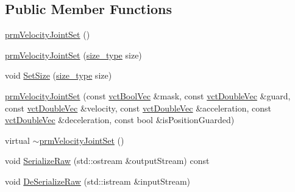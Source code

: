 \subsection*{Public Member Functions}
\begin{DoxyCompactItemize}
\item 
\hyperlink{classprm_velocity_joint_set_a6c2c220f64bc8fafb07241815f2546de}{prm\-Velocity\-Joint\-Set} ()
\item 
\hyperlink{classprm_velocity_joint_set_a17bb88da2e0fe253726edd28b64235bb}{prm\-Velocity\-Joint\-Set} (\hyperlink{classprm_velocity_joint_set_a48434c7a4127357203c7cff1e6f2a429}{size\-\_\-type} size)
\item 
void \hyperlink{classprm_velocity_joint_set_a307b54b4c94077003b5aa83531b6bc07}{Set\-Size} (\hyperlink{classprm_velocity_joint_set_a48434c7a4127357203c7cff1e6f2a429}{size\-\_\-type} size)
\item 
\hyperlink{classprm_velocity_joint_set_a756a5405815b878cf325ed779582100e}{prm\-Velocity\-Joint\-Set} (const \hyperlink{vct_dynamic_vector_types_8h_aeb2237c134aee3769198bd9d55c8a9e0}{vct\-Bool\-Vec} \&mask, const \hyperlink{vct_dynamic_vector_types_8h_ade4b3068c86fb88f41af2e5187e491c2}{vct\-Double\-Vec} \&guard, const \hyperlink{vct_dynamic_vector_types_8h_ade4b3068c86fb88f41af2e5187e491c2}{vct\-Double\-Vec} \&velocity, const \hyperlink{vct_dynamic_vector_types_8h_ade4b3068c86fb88f41af2e5187e491c2}{vct\-Double\-Vec} \&acceleration, const \hyperlink{vct_dynamic_vector_types_8h_ade4b3068c86fb88f41af2e5187e491c2}{vct\-Double\-Vec} \&deceleration, const bool \&is\-Position\-Guarded)
\item 
virtual \hyperlink{classprm_velocity_joint_set_a462dcbe624a12501c8e9d4d6bcd31e51}{$\sim$prm\-Velocity\-Joint\-Set} ()
\item 
void \hyperlink{classprm_velocity_joint_set_ad1696e1f58de23b8d9882bd5be3aa5f9}{Serialize\-Raw} (std\-::ostream \&output\-Stream) const 
\item 
void \hyperlink{classprm_velocity_joint_set_a78b5acf3b0ee1c5de26b3e8e89009079}{De\-Serialize\-Raw} (std\-::istream \&input\-Stream)
\end{DoxyCompactItemize}
